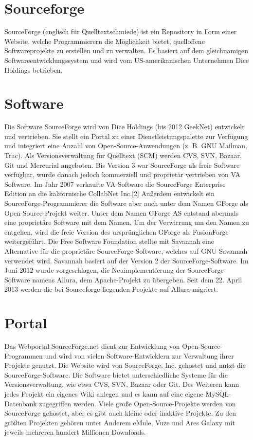 \section{Sourceforge}
SourceForge (englisch für Quelltextschmiede) ist ein Repository in Form einer Website, 
welche Programmierern die Möglichkeit bietet, quelloffene Softwareprojekte zu erstellen und zu verwalten. 
Es basiert auf dem gleichnamigen Softwareentwicklungssystem und wird vom US-amerikanischen Unternehmen 
Dice Holdings betrieben.
\section{Software}
Die Software SourceForge wird von Dice Holdings (bis 2012 GeekNet) entwickelt und vertrieben. 
Sie stellt ein Portal zu einer Dienstleistungspalette zur Verfügung und integriert eine 
Anzahl von Open-Source-Anwendungen (z. B. GNU Mailman, Trac). Als Versionsverwaltung für Quelltext (SCM) 
werden CVS, SVN, Bazaar, Git und Mercurial angeboten. Bis Version 3 war SourceForge als freie 
Software verfügbar, wurde danach jedoch kommerziell und proprietär vertrieben von VA Software. 
Im Jahr 2007 verkaufte VA Software die SourceForge Enterprise Edition an die kalifornische 
CollabNet Inc.[2] Außerdem entwickelt ein SourceForge-Programmierer die Software aber auch unter dem 
Namen GForge als Open-Source-Projekt weiter. Unter dem Namen GForge AS entstand abermals eine proprietäre 
Software mit dem Namen. Um der Verwirrung um den Namen zu entgehen, wird die freie Version des 
ursprünglichen GForge als FusionForge weitergeführt. Die Free Software Foundation stellte mit Savannah eine 
Alternative für die proprietäre SourceForge-Software, welches auf GNU Savannah verwendet wird. 
Savannah basiert auf der Version 2 der SourceForge-Software. Im Juni 2012 wurde vorgeschlagen, 
die Neuimplementierung der SourceForge-Software namens Allura, dem Apache-Projekt zu übergeben. 
Seit dem 22. April 2013 werden die bei Sourceforge liegenden Projekte auf Allura migriert.
\section{Portal}
Das Webportal SourceForge.net dient zur Entwicklung von Open-Source-Programmen und wird von vielen 
Software-Entwicklern zur Verwaltung ihrer Projekte genutzt. Die Website wird von SourceForge, Inc. 
gehostet und nutzt die SourceForge-Software. Die Software bietet unterschiedliche Systeme für 
die Versionsverwaltung, wie etwa CVS, SVN, Bazaar oder Git. Des Weiteren kann jedes Projekt ein 
eigenes Wiki anlegen und es kann auf eine eigene MySQL-Datenbank zugegriffen werden. 
Viele große Open-Source-Projekte werden von SourceForge gehostet, aber es gibt auch kleine oder 
inaktive Projekte. Zu den größten Projekten gehören unter Anderem eMule, Vuze und Ares Galaxy mit 
jeweils mehreren hundert Millionen Downloads.

